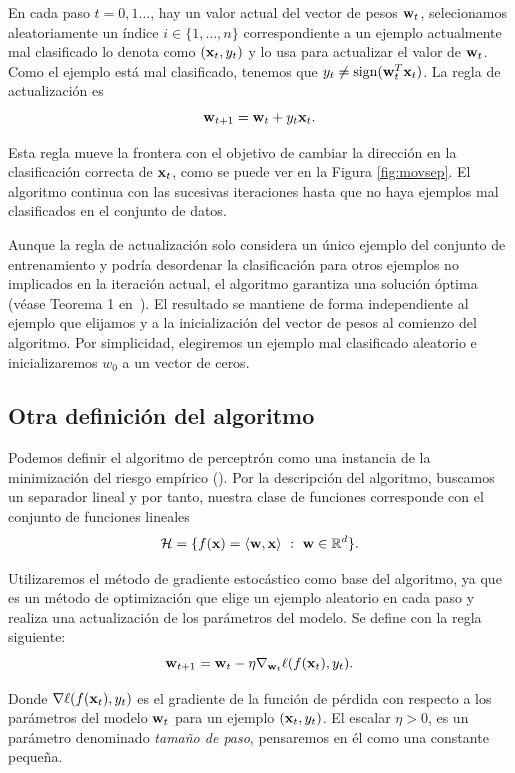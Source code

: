 \documentclass[oneside,openright,titlepage,numbers=noenddot,openany,headinclude,footinclude=true,
cleardoublepage=empty,abstractoff,BCOR=5mm,paper=a4,fontsize=12pt,main=spanish]{scrreprt}
\begin{document}
En cada paso $t=0,1\dots$, hay un valor actual del vector de pesos $\textbf{w}_t$, selecionamos aleatoriamente un índice $i\in \{1,\dots,n\}$ correspondiente a un ejemplo actualmente mal clasificado lo denota como $(\textbf{x}_t,y_t)$ y lo usa para actualizar el valor de $\textbf{w}_t$. Como el ejemplo está mal clasificado, tenemos que $y_t\neq \text{sign}(\textbf{w}^T_t\textbf{x}_t)$. La regla de actualización es $$\textbf{w}_{t+1}=\textbf{w}_t+y_t\textbf{x}_t.$$

Esta regla mueve la frontera con el objetivo de cambiar la dirección en la clasificación correcta de $\textbf{x}_t$, como se puede ver en la Figura \ref{fig:movsep}. El algoritmo continua con las sucesivas iteraciones hasta que no haya ejemplos mal clasificados en el conjunto de datos.

Aunque la regla de actualización solo considera un único ejemplo del conjunto de entrenamiento y podría desordenar la clasificación para otros ejemplos no implicados en la iteración actual, el algoritmo garantiza una solución óptima (véase Teorema 1 en~\cite{perceptronproof2012}). El resultado se mantiene de forma independiente al ejemplo que elijamos y a la inicialización del vector de pesos al comienzo del algoritmo. Por simplicidad, elegiremos un ejemplo mal clasificado aleatorio e inicializaremos $w_0$ a un vector de ceros.

\subsection*{Otra definición del algoritmo}

Podemos definir el algoritmo de perceptrón como una instancia de la minimización del riesgo empírico (\cite{fairnesslearning2019}). Por la descripción del algoritmo, buscamos un separador lineal y por tanto, nuestra clase de funciones corresponde con el conjunto de funciones lineales $$\mathcal H = \{ f(\textbf{x}) = \langle \textbf{w},\textbf{x} \rangle \ : \ \textbf{w} \in \mathbb R^d \}.$$

Utilizaremos el método de gradiente estocástico como base del algoritmo, ya que es un método de optimización que elige un ejemplo aleatorio en cada paso y realiza una actualización de los parámetros del modelo. Se define con la regla siguiente: $$\textbf{w}_{t+1}=\textbf{w}_t-\eta \nabla_{\textbf{w}_t} \ell (f(\textbf{x}_t),y_t).$$

Donde $\nabla \ell (f(\textbf{x}_t),y_t)$ es el gradiente de la función de pérdida con respecto a los parámetros del modelo $\textbf{w}_t$ para un ejemplo $(\textbf{x}_t,y_t)$. El escalar $\eta > 0$, es un parámetro denominado \textit{tamaño de paso}, pensaremos en él como una constante pequeña.
\end{document}
